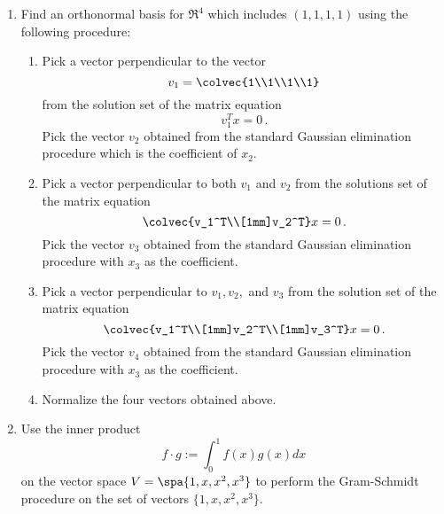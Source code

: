 \begin{enumerate}




\item Find an orthonormal  basis for $\Re^4$ which includes $(1,1,1,1)$ using the following procedure:\\
\begin{enumerate} 
\item Pick a vector perpendicular to the vector 
\[v_1 =\colvec{1\\1\\1\\1}\] from the solution set of the matrix equation \[v_1^Tx=0\, .\] Pick the vector $v_2$ obtained from the standard Gaussian elimination procedure which is the coefficient of $x_2$.
\item Pick a vector perpendicular to both $v_1$ and $v_2$ from the solutions set of the matrix equation \[\colvec{v_1^T\\[1mm]v_2^T}x=0\, .\] Pick the vector $v_3$ obtained from the standard Gaussian elimination procedure with $x_3$ as the coefficient. 
\item Pick a vector perpendicular to $v_1,v_2,$ and $v_3$ from the solution set of the matrix equation \[\colvec{v_1^T\\[1mm]v_2^T\\[1mm]v_3^T}x=0\, .\]  Pick the vector $v_4$ obtained from the standard Gaussian elimination procedure with $x_3$ as the coefficient. 
\item Normalize the four vectors obtained   above.
\end{enumerate}


\item Use the inner product \[f\cdot g := \int_0^1 f(x)g(x)dx\]  on the vector space $V=\spa \{1,x,x^2,x^3\}$ to perform the Gram-Schmidt procedure on the set of vectors $\{1,x,x^2,x^3\}$. 


\end{enumerate}
